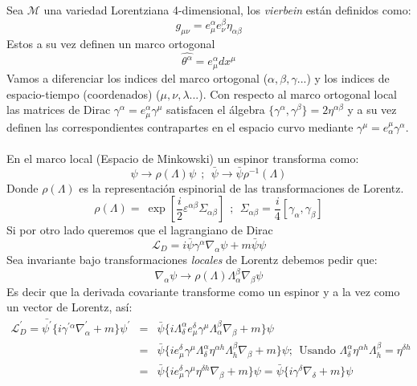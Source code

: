 Sea $\mathcal{M}$ una variedad Lorentziana 4-dimensional, los \textit{vierbein} están definidos como: 
\begin{equation}
g_{\mu\nu}=e_{\mu}^{\alpha}e_{\nu}^{\beta}\eta_{\alpha\beta}
\end{equation}
Estos a su vez definen un marco ortogonal
\begin{equation}
\hat{\theta^{\alpha}}=e_{\mu}^{\alpha}dx^{\mu}
\end{equation}
Vamos a diferenciar los indices del marco ortogonal ($\alpha ,\beta ,\gamma ...$) y los indices de espacio-tiempo (coordenados) ($\mu ,\nu ,\lambda ...$). Con respecto al marco ortogonal local las matrices de Dirac $\gamma^\alpha=e^{\alpha}_{\mu}\gamma^\mu$ satisfacen el álgebra $\{\gamma^{\alpha},\gamma^{\beta}\}=2\eta^{\alpha\beta}$ y a su vez definen las correspondientes contrapartes en el espacio curvo mediante $\gamma^{\mu}=e_{\alpha}^{\mu}\gamma^{\alpha}$.
\\
\\
En el marco local (Espacio de Minkowski) un espinor transforma como:
\begin{equation}
\psi\to\rho(\Lambda)\psi \ \ ;\ \ \bar{\psi}\to\bar{\psi}\rho^{-1}(\Lambda)
\end{equation}
Donde $\rho(\Lambda)$ es la representación espinorial de las transformaciones de Lorentz.
\begin{equation}
\rho(\Lambda)=\ \exp\left[\frac{i}{2}\varepsilon^{\alpha\beta}\Sigma_{\alpha\beta}\right]\ \ ;\ \ \Sigma_{\alpha\beta}=\frac{i}{4}[\gamma_{\alpha},\gamma_{\beta}]
\end{equation}
Si por otro lado queremos que el lagrangiano de Dirac
\begin{equation}
\mathcal{L}_D=i\bar{\psi}\gamma^{\alpha}\nabla_{\alpha}\psi+m\bar{\psi}\psi
\end{equation}
Sea invariante bajo transformaciones \textit{locales} de Lorentz debemos pedir que:
\begin{equation}
\nabla_{\alpha}\psi\to\rho(\Lambda)\Lambda_{\alpha}^{\beta}\nabla_{\beta}\psi
\end{equation}
Es decir que la derivada covariante transforme como un espinor y a la vez como un vector de Lorentz, así:
\begin{eqnarray}
\nonumber \mathcal{L}_{D}^{\prime}=\bar{\psi^{\prime}}\{i\gamma^{\prime\alpha}\nabla_{\alpha}^{\prime}+m\}\psi^{\prime}&=& 	\bar{\psi}\{i\Lambda_{\delta}^{\alpha}e_{\mu}^{\delta}\gamma^{\mu}\Lambda_{\alpha}^{\beta}\nabla_{\beta}+m\}\psi\\
\nonumber &=& \bar{\psi}\{ie_{\mu}^{\delta}\gamma^{\mu}\Lambda_{\delta}^{\alpha}\eta^{\alpha h}\Lambda_{h}^{\beta}\nabla_{\beta}+m\}\psi;\ \ \text{Usando }\Lambda_{\delta}^{\alpha}\eta^{\alpha h}\Lambda_{h}^{\beta}=\eta^{\delta h}\\
&=& \bar{\psi}\{ie_{\mu}^{\delta}\gamma^{\mu}\eta^{\delta h}\nabla_{\beta}+m\}\psi=\bar{\psi}\{i\gamma^{\delta}\nabla_{\delta}+m\}\psi
\end{eqnarray}
